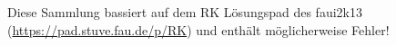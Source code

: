 \documentclass{article}
\begin{document}
	\begin{small}
		Diese Sammlung bassiert auf dem RK L\"osungspad des faui2k13 (\url{https://pad.stuve.fau.de/p/RK}) und enthält möglicherweise Fehler!
	\end{small}
			
			
			
			
			
			
			
			
			
			
			
			
			
			
			
			
			
			
			
			
			
			
			
			
			
			
			
			
			
			
			
			
			
			
			
			
			
			
			
			
			
			
			
			
			
			
			
			
			
			
			
\end{document}
